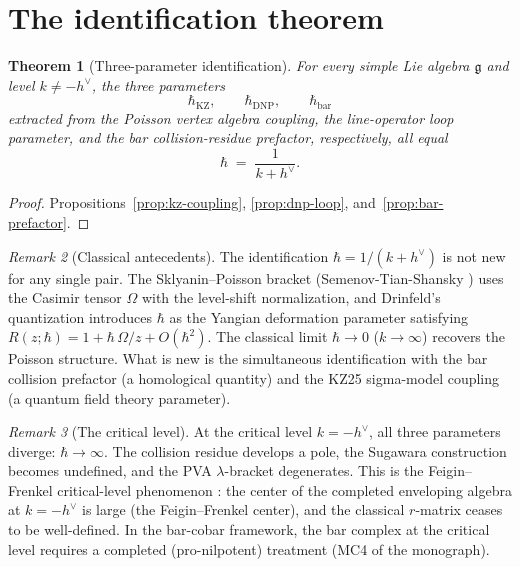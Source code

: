 \documentclass[11pt]{article}
\theoremstyle{plain}
\newtheorem{theorem}{Theorem}[section]
\theoremstyle{definition}
\theoremstyle{remark}
\newtheorem{remark}[theorem]{Remark}
\newcommand{\fg}{\mathfrak{g}}
\numberwithin{equation}{section}
\begin{document}
\section{The identification theorem}\label{sec:identification}

\begin{theorem}[Three-parameter identification]
\label{thm:three-parameter}
For every simple Lie algebra $\fg$ and level
$k \neq -h^\vee$, the three parameters
\[
 \hbar_{\mathrm{KZ}},
 \qquad
 \hbar_{\mathrm{DNP}},
 \qquad
 \hbar_{\mathrm{bar}}
\]
extracted from the Poisson vertex algebra coupling, the
line-operator loop parameter, and the bar collision-residue
prefactor, respectively, all equal
\begin{equation}\label{eq:three-parameter}
 \hbar
 \;=\;
 \frac{1}{k + h^\vee}.
\end{equation}
\end{theorem}

\begin{proof}
Propositions~\ref{prop:kz-coupling}, \ref{prop:dnp-loop},
and~\ref{prop:bar-prefactor}.
\end{proof}

\begin{remark}[Classical antecedents]\label{rem:classical}
The identification $\hbar = 1/(k + h^\vee)$ is not new for any
single pair. The Sklyanin--Poisson bracket
(Semenov-Tian-Shansky \cite{STS1983}) uses the Casimir tensor
$\Omega$ with the level-shift normalization, and Drinfeld's
quantization \cite{Drinfeld1985} introduces $\hbar$ as the Yangian
deformation parameter satisfying
$R(z;\hbar) = 1 + \hbar\,\Omega/z + O(\hbar^2)$. The classical
limit $\hbar \to 0$ ($k \to \infty$) recovers the Poisson structure.
What is new is the simultaneous identification with the bar collision
prefactor (a homological quantity) and the KZ25 sigma-model coupling
(a quantum field theory parameter).
\end{remark}

\begin{remark}[The critical level]\label{rem:critical}
At the critical level $k = -h^\vee$, all three parameters diverge:
$\hbar \to \infty$. The collision residue develops a pole, the
Sugawara construction becomes undefined, and the PVA $\lambda$-bracket
degenerates. This is the Feigin--Frenkel critical-level phenomenon
\cite{FF92}: the center of the completed enveloping algebra at
$k = -h^\vee$ is large (the Feigin--Frenkel center), and the
classical $r$-matrix ceases to be well-defined. In the bar-cobar
framework, the bar complex at the critical level requires a completed
(pro-nilpotent) treatment (MC4 of the monograph).
\end{remark}
\end{document}
